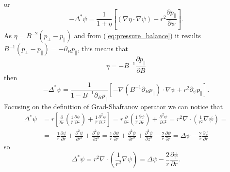 or
\begin{equation*}
  -\Delta^*\psi=\frac{1}{1+\eta}\left[(\nabla\eta\cdot\nabla\psi)+r^2\frac{\partial p_\parallel}{\partial \psi}\right].
\end{equation*}
As $\eta=B^{-2}(p_\perp-p_\parallel)$ and from (\ref{eq:pressure_balance}) it results $B^{-1}(p_\perp-p_\parallel)=-\partial_B p_\parallel$, this means that
\begin{equation*}
  \eta=-B^{-1}\frac{\partial p_\parallel}{\partial B}
\end{equation*}
then
\begin{equation*}
  -\Delta^*\psi=\frac{1}{1-B^{-1}\partial_B p_\parallel}\left[-\nabla(B^{-1}\partial_B p_\parallel)\cdot\nabla\psi+r^2\partial_\psi p_\parallel\right].
\end{equation*}
Focusing on the definition of Grad-Shafranov operator we can notice that
\begin{equation*}
  \begin{split}
    \Delta^*\psi&=r\left[\frac{\partial}{\partial r}\left(\frac{1}{r}\frac{\partial\psi}{\partial r}\right)+\frac{1}{r}\frac{\partial^2\psi}{\partial z^2}\right]=r\frac{\partial}{\partial r}\left(\frac{1}{r}\frac{\partial\psi}{\partial r}\right)+\frac{\partial^2\psi}{\partial z^2}=r^2\nabla\cdot\left(\frac{1}{r^2}\nabla\psi\right)=\\
    &=-\frac{1}{r}\frac{\partial\psi}{\partial r}+\frac{\partial^2\psi}{\partial r^2}+\frac{\partial^2\psi}{\partial z^2}=\frac{1}{r}\frac{\partial\psi}{\partial r}+\frac{\partial^2\psi}{\partial r^2}+\frac{\partial^2\psi}{\partial z^2}-\frac{2}{r}\frac{\partial\psi}{\partial r}=\Delta\psi-\frac{2}{r}\frac{\partial\psi}{\partial r}
  \end{split}
\end{equation*}
so
\begin{equation*}
 \Delta^*\psi=r^2\nabla\cdot\left(\frac{1}{r^2}\nabla\psi\right)=\Delta\psi-\frac{2}{r}\frac{\partial\psi}{\partial r}.
\end{equation*}
